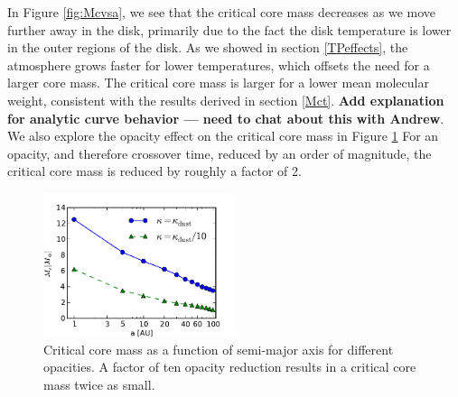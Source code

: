 \documentclass[apj]{emulateapj}
\begin{document}
 In Figure \ref{fig:Mcvsa}, we see that the critical core mass decreases as we move further away in the disk, primarily due to the fact the disk temperature is lower in the outer regions of the disk. As we showed in section \ref{TPeffects}, the atmosphere grows faster for lower temperatures, which offsets the need for a larger core mass. The critical core mass is larger for a lower mean molecular weight, consistent with the results derived in section \ref{Mct}. \textbf{Add explanation for analytic curve behavior --- need to chat about this with Andrew}. We also explore the opacity effect on the critical core mass in Figure \ref{fig:Mcritopacity} For an opacity, and therefore crossover time, reduced by an order of magnitude, the critical core mass is reduced by roughly a factor of 2. 

%
% 
% 
%



\begin{figure}[h]
\centering
\includegraphics[width=0.5\textwidth]{../../figs/ModelAtmospheres/RadSelfGravPoly/PaperFigs/Mcrit_vs_a_3Myrs_opacity.pdf}
\caption{Critical core mass as a function of semi-major axis for different opacities. A factor of ten opacity reduction results in a critical core mass twice as small.}
\label{fig:Mcritopacity}
\end{figure}
\end{document}
